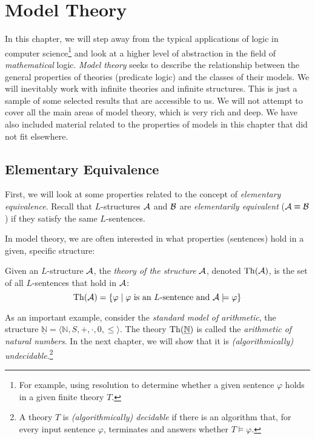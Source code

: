 \chapter{Model Theory}\label{chapter:model-theory}

In this chapter, we will step away from the typical applications of logic in computer science\footnote{For example, using resolution to determine whether a given sentence $\varphi$ holds in a given finite theory $T$.} and look at a higher level of abstraction in the field of \emph{mathematical} logic. \emph{Model theory} seeks to describe the relationship between the general properties of theories (predicate logic) and the classes of their models. We will inevitably work with infinite theories and infinite structures. This is just a sample of some selected results that are accessible to us. We will not attempt to cover all the main areas of model theory, which is very rich and deep. We have also included material related to the properties of models in this chapter that did not fit elsewhere.

\section{Elementary Equivalence}

First, we will look at some properties related to the concept of \emph{elementary equivalence}. Recall that $L$-structures $\mathcal{A}$ and $\mathcal{B}$ are \emph{elementarily equivalent} ($\mathcal{A}\equiv \mathcal{B}$) if they satisfy the same $L$-sentences.

In model theory, we are often interested in what properties (sentences) hold in a given, specific structure:

\begin{definition}
Given an $L$-structure $\mathcal{A}$, the \emph{theory of the structure} $\mathcal{A}$, denoted $\operatorname{Th}(\mathcal{A})$, is the set of all $L$-sentences that hold in $\mathcal{A}$:
$$
\operatorname{Th}(\mathcal{A})=\{\varphi\mid\varphi \text{ is an $L$-sentence and } \mathcal{A}\models\varphi\}
$$
\end{definition}

\begin{example}
As an important example, consider the \emph{standard model of arithmetic}, the structure $\underline{\mathbb{N}}=\langle\mathbb{N},S,+,\cdot,0,\le\rangle$. The theory $\operatorname{Th}(\underline{\mathbb{N}})$ is called the \emph{arithmetic of natural numbers}. In the next chapter, we will show that it is \emph{(algorithmically) undecidable}.\footnote{A theory $T$ is \emph{(algorithmically) decidable} if there is an algorithm that, for every input sentence $\varphi$, terminates and answers whether $T\models\varphi$.}
\end{example}

